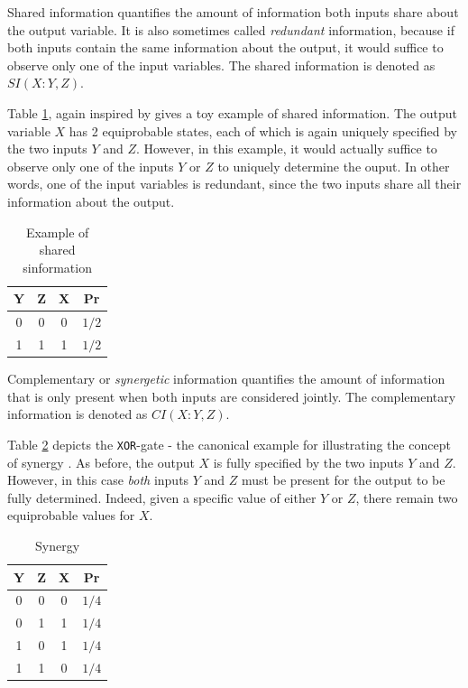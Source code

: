 \documentclass[12pt]{article}
\begin{document}
Shared information quantifies the amount of information both inputs share about the output variable. It is also sometimes called \textit{redundant} information, because if both inputs contain the same information about the output, it would suffice to observe only one of the input variables. The shared information is denoted as $SI(X:Y,Z)$.

Table \ref{table:2}, again inspired by \cite{pid-synergy} gives a toy example of shared information. The output variable $X$ has 2 equiprobable states, each of which is again uniquely specified by the two inputs $Y$ and $Z$. However, in this example, it would actually suffice to observe only one of the inputs $Y$ or $Z$ to uniquely determine the ouput. In other words, one of the input variables is redundant, since the two inputs share all their information about the output.

\begin{table}[h!]
\centering
\begin{tabular}{|c c |c|c|}
	\hline
	Y & Z & X & Pr\\ 
	\hline
	0 & 0 & 0 & $1/2$\\
	1 & 1 & 1 & $1/2$\\ 
	\hline
\end{tabular}
\caption{Example of shared sinformation}
\label{table:2}
\end{table}

Complementary or \textit{synergetic} information quantifies the amount of information that is only present when both inputs are considered jointly. The complementary information is denoted as $CI(X:Y,Z)$. 

Table \ref{table:3} depicts the \texttt{XOR}-gate - the canonical example for illustrating the concept of synergy \cite{pid-synergy}. As before, the output $X$ is fully specified by the two inputs $Y$ and $Z$. However, in this case \textit{both} inputs $Y$ and $Z$ must be present for the output to be fully determined. Indeed, given a specific value of either $Y$ or $Z$, there remain two equiprobable values for $X$. 

\begin{table}[h!]
\centering
\begin{tabular}{|c c |c|c|}
	\hline
	Y & Z & X & Pr\\ 
	\hline
	0 & 0 & 0 & $1/4$ \\
	0 & 1 & 1 & $1/4$ \\ 
	1 & 0 & 1 & $1/4$ \\ 
	1 & 1 & 0 & $1/4$ \\ 
	\hline
\end{tabular}
\caption{Synergy}
\label{table:3}
\end{table}
\end{document}
